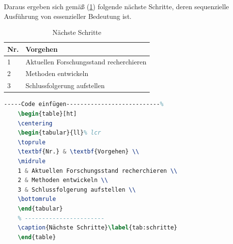 Daraus ergeben sich gemäß (\ref{tab:schritte}) folgende nächste Schritte, deren sequenzielle Ausführung von essenzieller Bedeutung ist.

\begin{table}[ht]
	\centering
	\begin{tabular}{ll}%
		\toprule
		\textbf{Nr.} & \textbf{Vorgehen} \\
		\midrule
		1 & Aktuellen Forschungsstand recherchieren \\
		2 & Methoden entwickeln \\
		3 & Schlussfolgerung aufstellen \\
		\bottomrule
	\end{tabular}
	\caption{Nächste Schritte}\label{tab:schritte}
\end{table}

\begin{lstlisting}[language=TeX,% C, TeX, Bash, Python
]-----Code einfügen---------------------------%
	\begin{table}[ht]
	\centering
	\begin{tabular}{ll}% lcr
	\toprule
	\textbf{Nr.} & \textbf{Vorgehen} \\
	\midrule
	1 & Aktuellen Forschungsstand recherchieren \\
	2 & Methoden entwickeln \\
	3 & Schlussfolgerung aufstellen \\
	\bottomrule
	\end{tabular}
	% -----------------------
	\caption{Nächste Schritte}\label{tab:schritte}
	\end{table}
\end{lstlisting}
